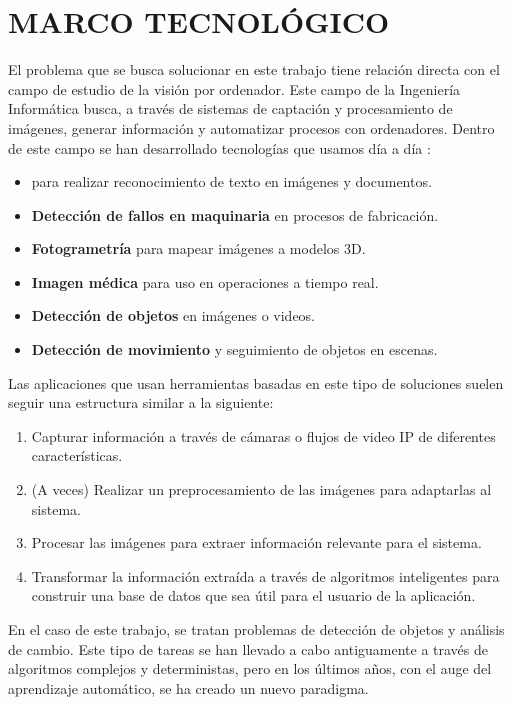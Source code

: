 \section{MARCO TECNOLÓGICO}

El problema que se busca solucionar en este trabajo tiene relación directa con el campo de estudio de la visión por ordenador. Este campo de la Ingeniería Informática busca, 
a través de sistemas de captación y procesamiento de imágenes, generar información y automatizar procesos con ordenadores. \newline Dentro de este campo se han desarrollado tecnologías que usamos día a día
\cite{szeliskiComputerVisionAlgorithms2022}:

\begin{itemize}
    \item \textbf{\textit{}} para realizar reconocimiento de texto en imágenes y documentos.
    \item \textbf{Detección de fallos en maquinaria} en procesos de fabricación.
    \item \textbf{Fotogrametría} para mapear imágenes a modelos 3D.
    \item \textbf{Imagen médica} para uso en operaciones a tiempo real\cite{NEMESIS3DCM}.
    \item \textbf{Detección de objetos} en imágenes o videos.
    \item \textbf{Detección de movimiento} y seguimiento de objetos en escenas.
\end{itemize}

Las aplicaciones que usan herramientas basadas en este tipo de soluciones suelen seguir una estructura similar a la siguiente:

\begin{enumerate}
    \item Capturar información a través de cámaras o flujos de video IP de diferentes características.
    \item (A veces) Realizar un preprocesamiento de las imágenes para adaptarlas al sistema.
    \item Procesar las imágenes para extraer información relevante para el sistema.
    \item Transformar la información extraída a través de algoritmos inteligentes para construir una base de datos que sea útil para el usuario de la aplicación.
\end{enumerate}

En el caso de este trabajo, se tratan problemas de detección de objetos y análisis de cambio. Este tipo de tareas se han llevado a cabo antiguamente a través de algoritmos complejos y deterministas, pero en los últimos 
años, con el auge del aprendizaje automático, se ha creado un nuevo paradigma.

